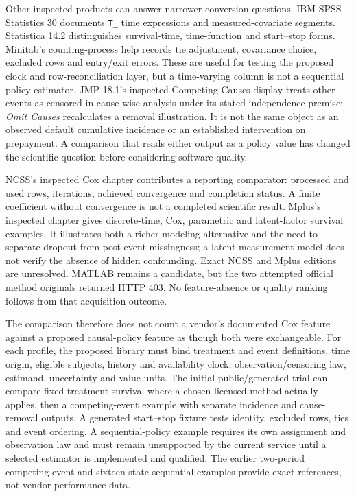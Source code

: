 Other inspected products can answer narrower conversion questions. IBM SPSS
Statistics 30 documents \texttt{T\_} time expressions and measured-covariate
segments. Statistica 14.2 distinguishes survival-time, time-function and
start--stop forms. Minitab's counting-process help records tie adjustment,
covariance choice, excluded rows and entry/exit errors. These are useful for
testing the proposed clock and row-reconciliation layer, but a time-varying
column is not a sequential policy estimator. JMP 18.1's inspected
Competing Causes display treats other events as censored in cause-wise
analysis under its stated independence premise; \emph{Omit Causes}
recalculates a removal illustration. It is not the same object as an
observed default cumulative incidence or an established intervention on
prepayment. A comparison that reads either output as a policy value has
changed the scientific question before considering software quality.
\citep{exec14_survival_ibm,exec14_survival_statistica,exec14_survival_minitab,exec14_survival_jmp}

NCSS's inspected Cox chapter contributes a reporting comparator: processed
and used rows, iterations, achieved convergence and completion status. A
finite coefficient without convergence is not a completed scientific result.
Mplus's inspected chapter gives discrete-time, Cox, parametric and latent-factor
survival examples. It illustrates both a richer modeling alternative and the
need to separate dropout from post-event missingness; a latent measurement
model does not verify the absence of hidden confounding. Exact NCSS and Mplus
editions are unresolved. MATLAB remains a candidate, but the two attempted
official method originals returned HTTP 403. No feature-absence or quality
ranking follows from that acquisition outcome.
\citep{exec14_survival_ncss,exec14_survival_mplus,exec16_commercial_matrix}

The comparison therefore does not count a vendor's documented Cox feature
against a proposed causal-policy feature as though both were exchangeable.
For each profile, the proposed library must bind treatment and event
definitions, time origin, eligible subjects, history and availability clock,
observation/censoring law, estimand, uncertainty and value units. The initial
public/generated trial can compare fixed-treatment survival where a chosen
licensed method actually applies, then a competing-event example with separate
incidence and cause-removal outputs. A generated start--stop fixture tests
identity, excluded rows, ties and event ordering. A sequential-policy example
requires its own assignment and observation law and must remain unsupported by
the current service until a selected estimator is implemented and qualified.
The earlier two-period competing-event and sixteen-state sequential examples
provide exact references, not vendor performance data.
\citep{exec14_survival_exact,exec16_commercial_matrix}

